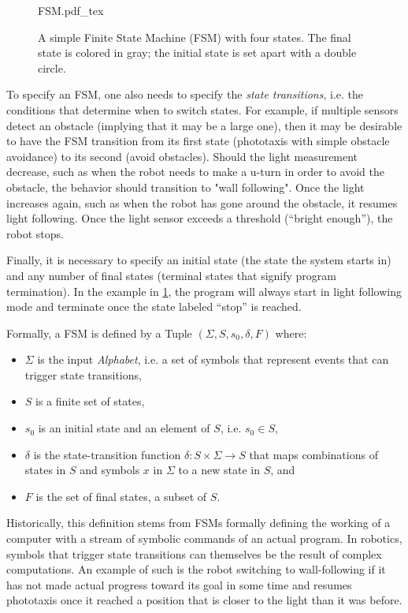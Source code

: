 \begin{figure}
\centering
    \small
    \def\svgwidth{0.9\textwidth}
    {FSM.pdf_tex}
\caption{A simple Finite State Machine (FSM) with four states. The final state is colored in gray; the initial state is set apart with a double circle.\label{fig:fsm}}
\end{figure}

To specify an FSM, one also needs to specify the \textsl{state transitions}, i.e. the conditions that determine when to switch states. For example, if multiple sensors detect an obstacle (implying that it may be a large one), then it may be desirable to have the FSM transition from its first state (phototaxis with simple obstacle avoidance) to its second (avoid obstacles). Should the light measurement decrease, such as when the robot needs to make a u-turn in order to avoid the obstacle, the behavior should transition to "wall following". Once the light increases again, such as when the robot has gone around the obstacle, it resumes light following. Once the light sensor exceeds a threshold (``bright enough''), the robot stops.

Finally, it is necessary to specify an initial state (the state the system starts in) and any number of final states (terminal states that signify program termination). In the example in \cref{fig:fsm}, the program will always start in light following mode and terminate once the state labeled ``stop'' is reached.

Formally, a FSM is defined by a Tuple $(\Sigma, S, s_0, \delta, F)$ where:
\begin{itemize}
\item $\Sigma$ is the input \textsl{Alphabet}, i.e. a set of symbols that represent events that can trigger state transitions,
\item $S$ is a finite set of states,
\item $s_0$ is an initial state and an element of $S$, i.e. $s_0 \in S$,
\item $\delta$ is the state-transition function $\delta: S \times \Sigma \rightarrow S$ that maps combinations of states in $S$ and symbols $x$ in $\Sigma$ to a new state in $S$, and
\item $F$ is the set of final states, a subset of $S$.
\end{itemize}

Historically, this definition stems from FSMs formally defining the working of a computer with a stream of symbolic commands of an actual program. In robotics, symbols that trigger state transitions can themselves be the result of complex computations. An example of such is the robot switching to wall-following if it has not made actual progress toward its goal in some time and resumes phototaxis once it reached a position that is closer to the light than it was before.

